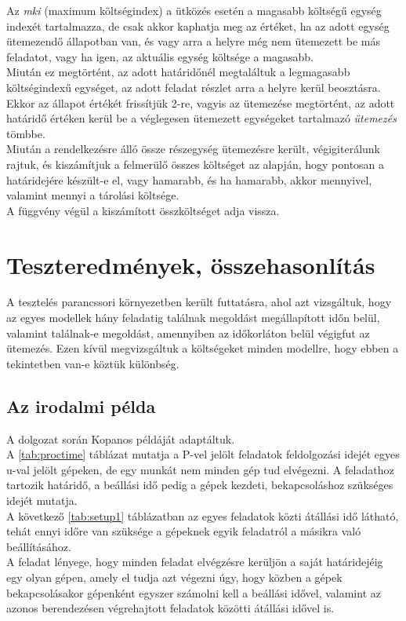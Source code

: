 \documentclass [12pt]{report}
\begin{document}
Az \emph{mki} (maximum költségindex) a ütközés esetén a magasabb költségű egység indexét tartalmazza, de csak akkor kaphatja meg az értéket, ha az adott egység ütemezendő állapotban van, és vagy arra a helyre még nem ütemezett be más feladatot, vagy ha igen, az aktuális egység költsége a magasabb.\\
Miután ez megtörtént, az adott határidőnél megtaláltuk a legmagasabb költségindexű egységet, az adott feladat részlet arra a helyre kerül beosztásra. Ekkor az állapot értékét frissítjük 2-re, vagyis az ütemezése megtörtént, az adott határidő értéken kerül be a véglegesen ütemezett egységeket tartalmazó \emph{ütemezés} tömbbe. \\
Miután a rendelkezésre álló össze részegység ütemezésre került, végigiterálunk rajtuk, és kiszámítjuk a felmerülő összes költséget az alapján, hogy pontosan a határidejére készült-e el, vagy hamarabb, és ha hamarabb, akkor mennyivel, valamint mennyi a tárolási költsége.\\ A függvény végül a kiszámított összköltséget adja vissza.

\chapter{Teszteredmények, összehasonlítás}
A tesztelés parancssori környezetben került futtatásra, ahol azt vizsgáltuk, hogy az egyes modellek hány feladatig találnak megoldást megállapított időn belül, valamint találnak-e megoldást, amennyiben az időkorláton belül végigfut az ütemezés. Ezen kívül megvizsgáltuk a költségeket minden modellre, hogy ebben a tekintetben van-e köztük különbség. 
\section{Az irodalmi példa}
A dolgozat során Kopanos\cite{Kopanos2009} példáját adaptáltuk.\\
A \ref{tab:proctime} táblázat mutatja a P-vel jelölt feladatok feldolgozási idejét egyes u-val jelölt gépeken, de egy munkát nem minden gép tud elvégezni. A feladathoz tartozik határidő, a beállási idő pedig a gépek kezdeti, bekapcsoláshoz szükséges idejét mutatja.\\
A következő \ref{tab:setup1} táblázatban az egyes feladatok közti átállási idő látható, tehát ennyi időre van szüksége a gépeknek egyik feladatról a másikra való beállításához.\\
A feladat lényege, hogy minden feladat elvégzésre kerüljön a saját határidejéig egy olyan gépen, amely el tudja azt végezni úgy, hogy közben a gépek bekapcsolásakor gépenként egyszer számolni kell a beállási idővel, valamint az azonos berendezésen végrehajtott feladatok közötti átállási idővel is. 
\end{document}
